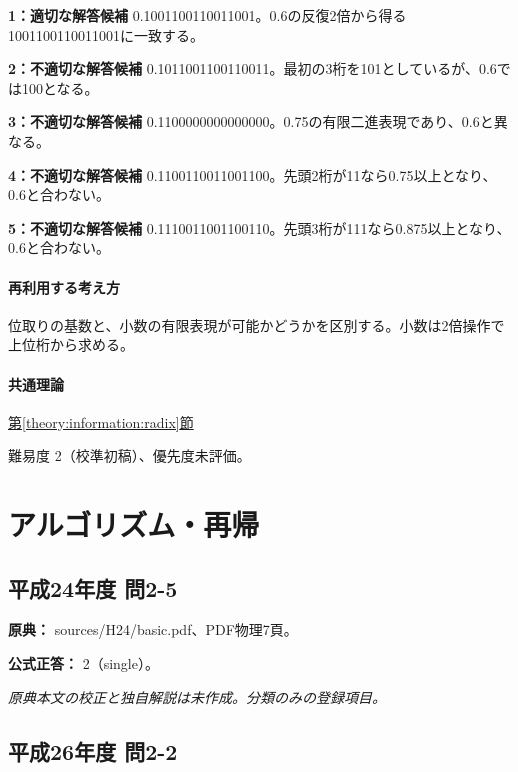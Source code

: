 \noindent\textbf{1：適切な解答候補} 0.1001100110011001。0.6の反復2倍から得る1001100110011001に一致する。\par

\noindent\textbf{2：不適切な解答候補} 0.1011001100110011。最初の3桁を101としているが、0.6では100となる。\par

\noindent\textbf{3：不適切な解答候補} 0.1100000000000000。0.75の有限二進表現であり、0.6と異なる。\par

\noindent\textbf{4：不適切な解答候補} 0.1100110011001100。先頭2桁が11なら0.75以上となり、0.6と合わない。\par

\noindent\textbf{5：不適切な解答候補} 0.1110011001100110。先頭3桁が111なら0.875以上となり、0.6と合わない。\par

\paragraph{再利用する考え方} 位取りの基数と、小数の有限表現が可能かどうかを区別する。小数は2倍操作で上位桁から求める。

\paragraph{共通理論} \hyperref[theory:information:radix]{第\ref*{theory:information:radix}節}

\par 難易度 2（校準初稿）、優先度未評価。

\section{アルゴリズム・再帰}

\subsection{平成24年度 問2-5}
\label{q:h24-reg-basic-2-5}

\noindent\textbf{原典：} sources/H24/basic.pdf、PDF物理7頁。

\textbf{公式正答：} 2（single）。

\par\textit{原典本文の校正と独自解説は未作成。分類のみの登録項目。}

\subsection{平成26年度 問2-2}
\label{q:h26-reg-basic-2-2}

